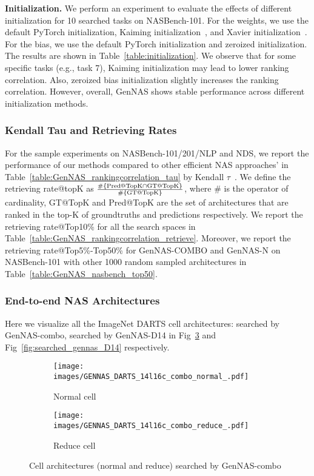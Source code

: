 \documentclass{article}
\begin{document}
\textbf{Initialization.}
We perform an experiment to evaluate the effects of different initialization for 10 searched tasks on NASBench-101. For the weights, we use the default PyTorch initialization, Kaiming initialization~\cite{he2015delving}, and Xavier initialization~\cite{glorot2010understanding}. For the bias, we use the default PyTorch initialization and zeroized initialization. The results are shown in Table~\ref{table:initialization}. We observe that for some specific tasks (e.g., task 7), Kaiming initialization may lead to lower ranking correlation. Also, zeroized bias initialization slightly increases the ranking correlation. However, overall, GenNAS shows stable performance across different initialization methods.
\subsubsection{Kendall Tau and Retrieving Rates}

For the sample experiments on NASBench-101/201/NLP and NDS, we report the performance of our methods compared to other efficient NAS approaches' in Table~\ref{table:GenNAS_rankingcorrelation_tau} by Kendall $\tau$~\cite{kendall1938new}. We define the retrieving rate@topK as $\frac{\#\{ \textnormal{Pred@TopK} \cap  \textnormal{GT@TopK} \}}{\#\{\textnormal{GT@TopK}\}}$, where $\#$ is the operator of cardinality, GT@TopK and Pred@TopK are the set of architectures that are ranked in the top-K of groundtruths and predictions respectively. We report the retrieving rate@Top10\% for all the search spaces in Table~\ref{table:GenNAS_rankingcorrelation_retrieve}. Moreover, we report the retrieving rate@Top5\%-Top50\% for GenNAS-COMBO and GenNAS-N on NASBench-101 with other 1000 random sampled architectures in Table~\ref{table:GenNAS_nasbench_top50}.


\subsubsection{End-to-end NAS Architectures}

Here we visualize all the ImageNet DARTS cell architectures: searched by GenNAS-combo, searched by GenNAS-D14 in Fig~\ref{fig:searched_gennas_combo} and Fig~\ref{fig:searched_gennas_D14} respectively.

\begin{figure}[h]
\centering
     \begin{subfigure}[b]{0.48\textwidth}
         \centering
         \texttt{[image: images/GENNAS\_DARTS\_14l16c\_combo\_normal\_.pdf]}
         \caption{Normal cell}
         \label{fig:COMBOnormal}
     \end{subfigure}
     \hfill
     \begin{subfigure}[b]{0.48\textwidth}
         \centering
         \texttt{[image: images/GENNAS\_DARTS\_14l16c\_combo\_reduce\_.pdf]}
         \caption{Reduce cell}
         \label{fig:COMBOreduce}
     \end{subfigure}
     \hfill
        \caption{Cell architectures (normal and reduce) searched by GenNAS-combo}
        \label{fig:searched_gennas_combo}
\end{figure}
\end{document}
